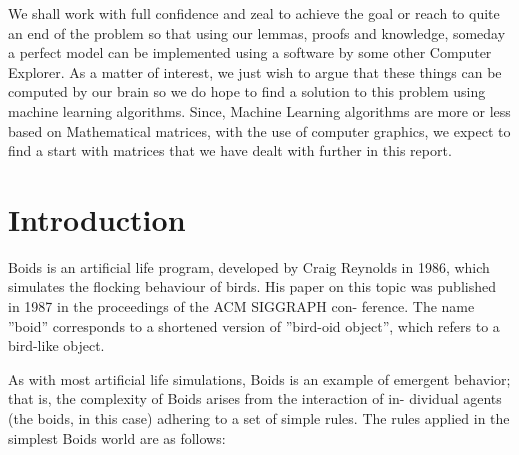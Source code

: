 \documentclass[12pt]{report}
\begin{document}
\vspace{0.2cm}
We shall work with full confidence and zeal to achieve the goal or reach to quite an end of the problem so that using our lemmas, proofs and knowledge, someday a perfect model can be implemented using a software by some other Computer Explorer. As a matter of interest, we just wish to argue that these things can be computed by our brain so we do hope to find a solution to this problem using machine learning algorithms. Since, Machine Learning algorithms are more or less based on Mathematical matrices, with the use of computer graphics, we expect to find a start with matrices that we have dealt with further in this report. 

\newpage

\tableofcontents

\newpage


\chapter{Introduction}

Boids is an artificial life program, developed by Craig Reynolds in 1986,
which simulates the flocking behaviour of birds. His paper on this topic
was published in 1987 in the proceedings of the ACM SIGGRAPH con-
ference. The name ”boid” corresponds to a shortened version of ”bird-oid
object”, which refers to a bird-like object.

\vspace{1cm}

As with most artificial life simulations, Boids is an example of emergent
behavior; that is, the complexity of Boids arises from the interaction of in-
dividual agents (the boids, in this case) adhering to a set of simple rules.
The rules applied in the simplest Boids world are as follows:
\end{document}
